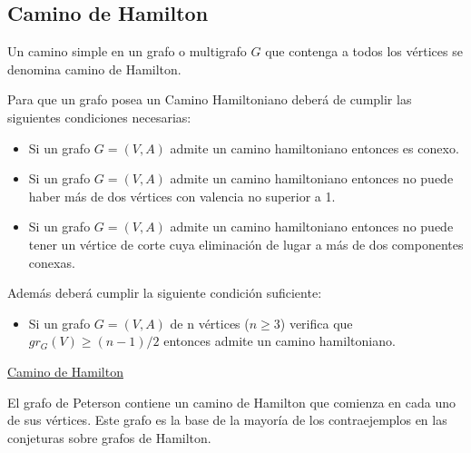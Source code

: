\subsection{Camino de Hamilton}

\begin{fondo}
Un camino simple en un grafo o multigrafo $G$ que contenga a todos los vértices se denomina camino de Hamilton.
\end{fondo}

Para que un grafo posea un Camino Hamiltoniano deberá de cumplir las siguientes condiciones necesarias:\\
\begin{itemize}
\item Si un grafo $G = (V,A)$ admite un camino hamiltoniano entonces es conexo.
\item Si un grafo $G = (V,A)$ admite un camino hamiltoniano entonces no puede haber más de dos vértices con valencia no superior a 1.
\item Si un grafo $G = (V,A)$ admite un camino hamiltoniano entonces no puede tener un vértice de corte cuya eliminación de lugar a más de dos componentes conexas.
\end{itemize}

Además deberá cumplir la siguiente condición suficiente:\\
\begin{itemize}
\item Si un grafo $G = (V,A)$ de n vértices ($n \geq 3$) verifica que $gr_G(V) \geq (n-1)/2$ entonces admite un camino hamiltoniano.
\end{itemize}

\underline{Camino de Hamilton}\\


\begin{ejem}
El grafo de Peterson contiene un camino de Hamilton que comienza en cada uno de sus vértices. Este grafo es la base de la mayoría de los contraejemplos en las conjeturas sobre grafos de Hamilton.\\
\end{ejem}

